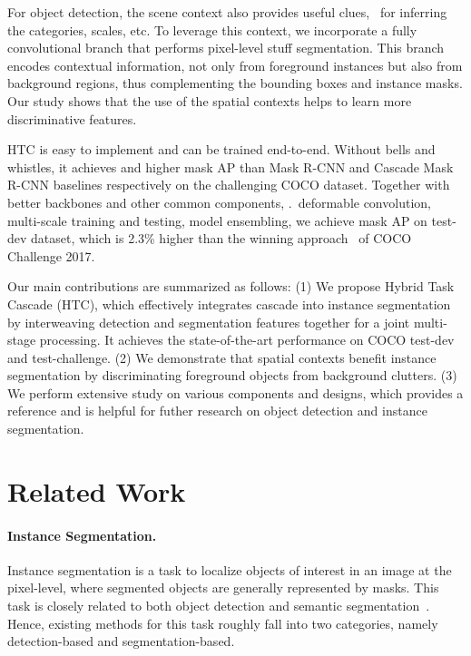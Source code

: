 \documentclass[10pt,twocolumn,letterpaper]{article}
\begin{document}
For object detection, the scene context also provides useful clues,
\eg~for inferring the categories, scales, etc. To leverage this context, we
incorporate a fully convolutional branch that performs pixel-level stuff
segmentation. This branch encodes contextual information, not only from foreground
instances but also from background regions, thus complementing the bounding boxes
and instance masks. Our study shows that the use of the spatial contexts helps
to learn more discriminative features.













HTC is easy to implement and can be trained end-to-end.
Without bells and whistles, it achieves  and  higher mask AP than
Mask R-CNN and Cascade Mask R-CNN baselines respectively on the challenging COCO dataset.
Together with better backbones and other common components, \eg.~deformable convolution,
multi-scale training and testing, model ensembling, we achieve  mask AP on test-dev dataset,
which is 2.3\% higher than the winning approach~\cite{liu2018path} of COCO Challenge 2017.

Our main contributions are summarized as follows:
(1) We propose Hybrid Task Cascade (HTC), which effectively integrates cascade into instance segmentation by interweaving detection and segmentation features together for a joint multi-stage processing.
It achieves the state-of-the-art performance on COCO test-dev and test-challenge.
(2) We demonstrate that spatial contexts benefit instance segmentation by discriminating foreground objects from background clutters.
(3) We perform extensive study on various components and designs, which provides a reference and is helpful for futher research on object detection and instance segmentation.

 

\section{Related Work}

\paragraph{Instance Segmentation.}
Instance segmentation is a task to localize objects of interest in an image
at the pixel-level, where segmented objects are generally represented by
masks. This task is closely related to both object detection and semantic
segmentation~\cite{liu2015semantic, li2017not}. Hence, existing methods for this task roughly fall into
two categories, namely detection-based and segmentation-based.
\end{document}
